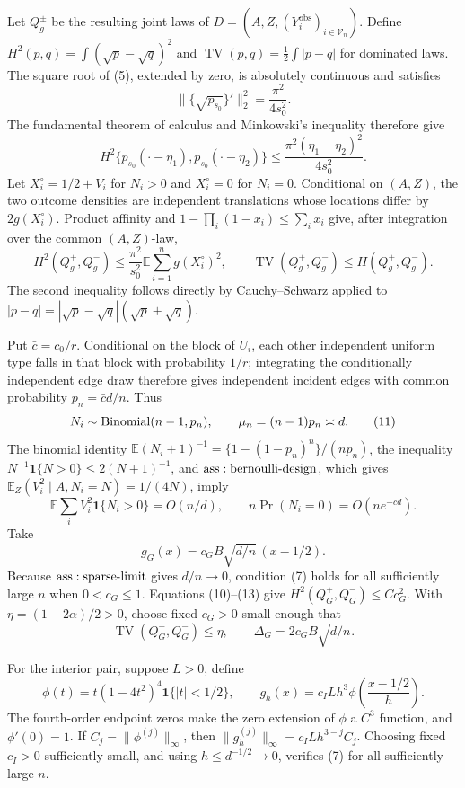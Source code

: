 Let \(Q_g^\pm\) be the resulting joint laws of \(D=(A,Z,(Y_i^{\mathrm{obs}})_{i\in\mathcal V_n})\).  Define \(H^2(p,q)=\int(\sqrt p-\sqrt q)^2\) and \(\operatorname{TV}(p,q)=\tfrac12\int|p-q|\) for dominated laws.  The square root of (5), extended by zero, is absolutely continuous and satisfies
\[
 \|\{\sqrt{p_{s_0}}\}'\|_2^2=\frac{\pi^2}{4s_0^2}.
\]
The fundamental theorem of calculus and Minkowski's inequality therefore give
\[
 H^2\{p_{s_0}(\mathord\cdot-\eta_1),p_{s_0}(\mathord\cdot-\eta_2)\}
 \leq\frac{\pi^2(\eta_1-\eta_2)^2}{4s_0^2}.
\tag{9}
\]
Let \(X_i^\circ=1/2+V_i\) for \(N_i>0\) and \(X_i^\circ=0\) for \(N_i=0\).  Conditional on \((A,Z)\), the two outcome densities are independent translations whose locations differ by \(2g(X_i^\circ)\).  Product affinity and \(1-\prod_i(1-x_i)\leq\sum_i x_i\) give, after integration over the common \((A,Z)\)-law,
\[
 H^2(Q_g^+,Q_g^-)
 \leq\frac{\pi^2}{s_0^2}\mathbb E\sum_{i=1}^ng(X_i^\circ)^2,
 \qquad
 \operatorname{TV}(Q_g^+,Q_g^-)
 \leq H(Q_g^+,Q_g^-).
\tag{10}
\]
The second inequality follows directly by Cauchy--Schwarz applied to \(|p-q|=|\sqrt p-\sqrt q|(\sqrt p+\sqrt q)\).

Put \(\bar c=c_0/r\).  Conditional on the block of \(U_i\), each other independent uniform type falls in that block with probability \(1/r\); integrating the conditionally independent edge draw therefore gives independent incident edges with common probability \(p_n=\bar c d/n\).  Thus
\[
 N_i\sim{\rm Binomial}(n-1,p_n),
 \qquad \mu_n=(n-1)p_n\asymp d.
\tag{11}
\]
The binomial identity \(\mathbb E(N_i+1)^{-1}=\{1-(1-p_n)^n\}/(np_n)\), the inequality \(N^{-1}\mathbf1\{N>0\}\leq2(N+1)^{-1}\), and \({\rm ass:bernoulli\text{-}design}\), which gives \(\mathbb E_Z(V_i^2\mid A,N_i=N)=1/(4N)\), imply
\[
 \mathbb E\sum_iV_i^2\mathbf1\{N_i>0\}=O(n/d),
 \qquad n\Pr(N_i=0)=O(ne^{-cd}).
\tag{12}
\]
Take
\[
 g_G(x)=c_GB\sqrt{d/n}\,(x-1/2).
\tag{13}
\]
Because \({\rm ass:sparse\text{-}limit}\) gives \(d/n\to0\), condition (7) holds for all sufficiently large \(n\) when \(0<c_G\leq1\).  Equations (10)--(13) give \(H^2(Q_G^+,Q_G^-)\leq Cc_G^2\).  With \(\eta=(1-2\alpha)/2>0\), choose fixed \(c_G>0\) small enough that
\[
 \operatorname{TV}(Q_G^+,Q_G^-)\leq\eta,
 \qquad \Delta_G=2c_GB\sqrt{d/n}.
\tag{14}
\]

For the interior pair, suppose \(L>0\), define
\[
 \phi(t)=t(1-4t^2)^4\mathbf1\{|t|<1/2\},
 \qquad
 g_h(x)=c_ILh^3\phi\!\left(\frac{x-1/2}{h}\right).
\tag{15}
\]
The fourth-order endpoint zeros make the zero extension of \(\phi\) a \(C^3\) function, and \(\phi'(0)=1\).  If \(C_j=\|\phi^{(j)}\|_\infty\), then \(\|g_h^{(j)}\|_\infty=c_ILh^{3-j}C_j\).  Choosing fixed \(c_I>0\) sufficiently small, and using \(h\leq d^{-1/2}\to0\), verifies (7) for all sufficiently large \(n\).


